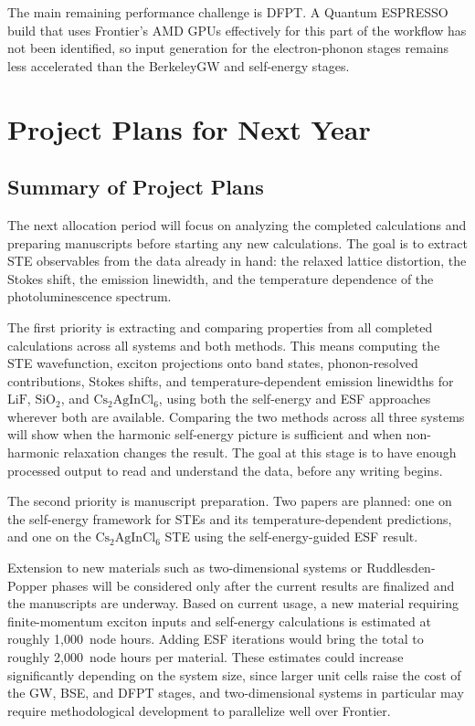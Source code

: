 \documentclass[11pt]{article}
\begin{document}
The main remaining performance challenge is DFPT. A Quantum ESPRESSO build that
uses Frontier's AMD GPUs effectively for this part of the workflow has not been
identified, so input generation for the electron-phonon stages remains less
accelerated than the BerkeleyGW and self-energy stages.

\section{Project Plans for Next Year}

\subsection{Summary of Project Plans}

The next allocation period will focus on analyzing the completed calculations
and preparing manuscripts before starting any new calculations. The goal is to
extract STE observables from the data already in hand: the relaxed lattice
distortion, the Stokes shift, the emission linewidth, and the temperature
dependence of the photoluminescence spectrum.

The first priority is extracting and comparing properties from all completed
calculations across all systems and both methods. This means computing the STE
wavefunction, exciton projections onto band states, phonon-resolved
contributions, Stokes shifts, and temperature-dependent emission linewidths for
\(\mathrm{LiF}\), \(\mathrm{SiO_2}\), and \(\mathrm{Cs_2AgInCl_6}\), using
both the self-energy and ESF approaches wherever both are available. Comparing
the two methods across all three systems will show when the harmonic self-energy
picture is sufficient and when non-harmonic relaxation changes the result. The
goal at this stage is to have enough processed output to read and understand the
data, before any writing begins.

The second priority is manuscript preparation. Two papers are planned: one on
the self-energy framework for STEs and its temperature-dependent predictions,
and one on the \(\mathrm{Cs_2AgInCl_6}\) STE using the self-energy-guided ESF
result.

Extension to new materials such as two-dimensional systems or Ruddlesden-Popper
phases will be considered only after the current results are finalized and
the manuscripts are underway. Based on current usage, a new material requiring
finite-momentum exciton inputs and self-energy calculations is estimated at
roughly 1,000~node hours. Adding ESF iterations would bring the total to
roughly 2,000~node hours per material. These estimates could increase
significantly depending on the system size, since larger unit cells raise the
cost of the GW, BSE, and DFPT stages, and two-dimensional systems in particular
may require methodological development to parallelize well over Frontier.
\end{document}
